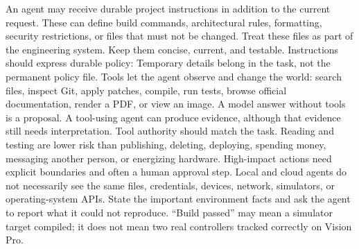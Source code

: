 \markdownRendererInterblockSeparator
{}An agent may receive durable project instructions in addition to the current\markdownRendererSoftLineBreak
{}request. These can define build commands, architectural rules, formatting,\markdownRendererSoftLineBreak
{}security restrictions, or files that must not be changed. Treat these files as\markdownRendererSoftLineBreak
{}part of the engineering system. Keep them concise, current, and testable.\markdownRendererParagraphSeparator
{}Instructions should express durable policy:\markdownRendererInterblockSeparator
{}\markdownRendererInterblockSeparator
{}Temporary details belong in the task, not the permanent policy file.\markdownRendererInterblockSeparator
{}
\markdownRendererSectionEnd \markdownRendererSectionBegin
{}\markdownRendererInterblockSeparator
{}Tools let the agent observe and change the world: search files, inspect Git,\markdownRendererSoftLineBreak
{}apply patches, compile, run tests, browse official documentation, render a PDF,\markdownRendererSoftLineBreak
{}or view an image. A model answer without tools is a proposal. A tool-using\markdownRendererSoftLineBreak
{}agent can produce evidence, although that evidence still needs interpretation.\markdownRendererParagraphSeparator
{}Tool authority should match the task. Reading and testing are lower risk than\markdownRendererSoftLineBreak
{}publishing, deleting, deploying, spending money, messaging another person, or\markdownRendererSoftLineBreak
{}energizing hardware. High-impact actions need explicit boundaries and often a\markdownRendererSoftLineBreak
{}human approval step.\markdownRendererInterblockSeparator
{}
\markdownRendererSectionEnd \markdownRendererSectionBegin
{}\markdownRendererInterblockSeparator
{}Local and cloud agents do not necessarily see the same files, credentials,\markdownRendererSoftLineBreak
{}devices, network, simulators, or operating-system APIs. State the important\markdownRendererSoftLineBreak
{}environment facts and ask the agent to report what it could not reproduce.\markdownRendererSoftLineBreak
{}“Build passed” may mean a simulator target compiled; it does not mean two real\markdownRendererSoftLineBreak
{}controllers tracked correctly on Vision Pro.\markdownRendererInterblockSeparator
{}
\markdownRendererSectionEnd \markdownRendererSectionBegin
